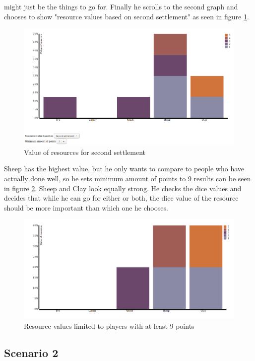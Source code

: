 \documentclass[journal]{vgtc}                %
\begin{document}
might just be the things to go for. Finally he scrolls to the second graph and
chooses to show "resource values based on second settlement" as seen in figure
\ref{fig:s13}.
\begin{figure}[!ht]
  \centering
  \includegraphics[width=\linewidth]{scen1-3.png}
  \caption{Value of resources for second settlement}
  \label{fig:s13}
\end{figure}
\noindent
Sheep has the highest value, but he only wants to compare to people who have
actually done well, so he sets minimum amount of points to 9 results can be
seen in figure \ref{fig:s14}. Sheep and Clay
look equally strong. He checks the dice values and decides that while he
can go for either or both, the dice value of the resource should be more
important than which one he chooses.
\begin{figure}[!ht]
  \centering
  \includegraphics[width=\linewidth]{scen1-4.png}
  \caption{Resource values limited to players with at least 9 points}
  \label{fig:s14}
\end{figure}
\noindent

\subsection{Scenario 2}
\end{document}
